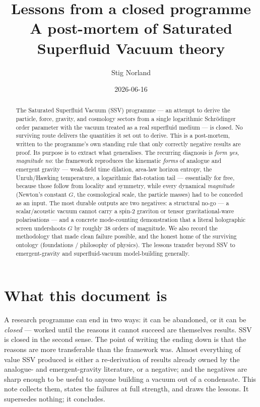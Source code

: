\documentclass[11pt]{article}
\title{Lessons from a closed programme\\[2pt]
\large A post-mortem of Saturated Superfluid Vacuum theory}
\author{Stig Norland}
\date{2026-06-16}
\begin{document}
\maketitle

\begin{abstract}
The Saturated Superfluid Vacuum (SSV) programme --- an attempt to derive the
particle, force, gravity, and cosmology sectors from a single logarithmic
Schr\"odinger order parameter with the vacuum treated as a real superfluid medium
--- is closed. No surviving route delivers the quantities it set out to derive.
This is a post-mortem, written to the programme's own standing rule that only
correctly negative results are proof. Its purpose is to extract what generalises.
The recurring diagnosis is \emph{form yes, magnitude no}: the framework reproduces
the kinematic \emph{forms} of analogue and emergent gravity --- weak-field time
dilation, area-law horizon entropy, the Unruh/Hawking temperature, a logarithmic
flat-rotation tail --- essentially for free, because those follow from locality
and symmetry, while every dynamical \emph{magnitude} (Newton's constant $G$, the
cosmological scale, the particle masses) had to be conceded as an input. The most
durable outputs are two negatives: a structural no-go --- a scalar/acoustic vacuum
cannot carry a spin-2 graviton or tensor gravitational-wave polarisations --- and
a concrete mode-counting demonstration that a literal holographic screen
undershoots $G$ by roughly 38 orders of magnitude. We also record the methodology
that made clean failure possible, and the honest home of the surviving ontology
(foundations / philosophy of physics). The lessons transfer beyond SSV to
emergent-gravity and superfluid-vacuum model-building generally.
\end{abstract}

\section{What this document is}

A research programme can end in two ways: it can be abandoned, or it can be
\emph{closed} --- worked until the reasons it cannot succeed are themselves
results. SSV is closed in the second sense. The point of writing the ending down
is that the reasons are more transferable than the framework was. Almost
everything of value SSV produced is either a re-derivation of results already
owned by the analogue- and emergent-gravity literature, or a negative; and the
negatives are sharp enough to be useful to anyone building a vacuum out of a
condensate. This note collects them, states the failures at full strength, and
draws the lessons. It supersedes nothing; it concludes.
\end{document}
